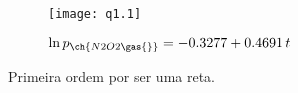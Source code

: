 \documentclass[\mainfilename]{subfiles}
\begin{document}
\begin{questionBox}
\begin{answerBox}
\begin{center}
\begin{tabular}{c *{7}{c}}
                \\\bottomrule
                
            \end{tabular}

            \begin{figure}\centering
                \texttt{[image: q1.1]}
                \caption{\(\ln{p_{\ch{N2O2\gas{}}}} = -0.3277 + 0.4691\,t\)}
            \end{figure}
        \end{center}

        Primeira ordem por ser uma reta.

    \end{answerBox}

\end{questionBox}
\end{document}
